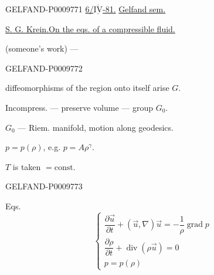 \begin{GelfandAdjacentEvidence}{GELFAND-P000977}{1}
\underline{6/\(\underline{\overline{\mathrm{IV}}}\)-81.}\qquad
\underline{Gelfand sem.}

\underline{\underline{S. G. Krein.}}\qquad \underline{On the eqs. of a compressible fluid.}

(someone’s work) --- 

\end{GelfandAdjacentEvidence}
\begin{GelfandAdjacentEvidence}{GELFAND-P000977}{2}

diffeomorphisms of the region onto itself arise $G$.

Incompress. --- preserve volume --- group $G_0$.

$G_0$ --- Riem. manifold, motion along geodesics.

 $p=p(\rho)$, e.g. $p=A\rho^\gamma$.

$T$ is taken $=\mathrm{const}$.
\end{GelfandAdjacentEvidence}
\begin{GelfandAdjacentEvidence}{GELFAND-P000977}{3}


Eqs.
\begin{equation*}
\begin{cases}
 \dfrac{\partial\vec u}{\partial t}+(\vec u,\nabla)\vec u
 =-\dfrac1{\rho}\operatorname{grad}p\\[4pt]
 \dfrac{\partial\rho}{\partial t}+\operatorname{div}(\rho\vec u)=0\\
 p=p(\rho)
\end{cases}
\tag{1}
\end{equation*}
\end{GelfandAdjacentEvidence}
